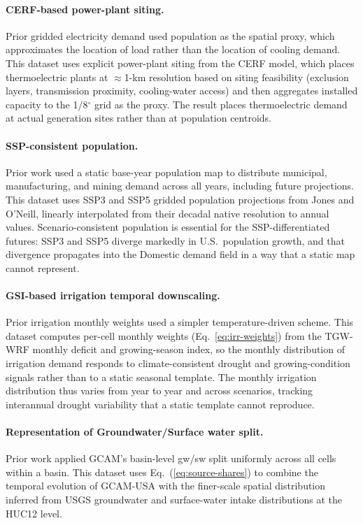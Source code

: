 \documentclass[fleqn,10pt]{wlscirep}
\begin{document}
\paragraph{CERF-based power-plant siting.} Prior gridded electricity demand used population as the spatial proxy, which approximates the location of load rather than the location of cooling demand. This dataset uses explicit power-plant siting from the CERF model\cite{Vernon2021,Mongird2025CERF}, which places thermoelectric plants at $\approx$1-km resolution based on siting feasibility (exclusion layers, transmission proximity, cooling-water access) and then aggregates installed capacity to the 1/8$^{\circ}$ grid as the proxy. The result places thermoelectric demand at actual generation sites rather than at population centroids.

\paragraph{SSP-consistent population.} Prior work used a static base-year population map to distribute municipal, manufacturing, and mining demand across all years, including future projections. This dataset uses SSP3 and SSP5 gridded population projections from Jones and O'Neill\cite{Jones_2016}, linearly interpolated from their decadal native resolution to annual values. Scenario-consistent population is essential for the SSP-differentiated futures: SSP3 and SSP5 diverge markedly in U.S.~population growth, and that divergence propagates into the Domestic demand field in a way that a static map cannot represent.

\paragraph{GSI-based irrigation temporal downscaling.} Prior irrigation monthly weights used a simpler temperature-driven scheme. This dataset computes per-cell monthly weights (Eq.~\ref{eq:irr-weights}) from the TGW-WRF monthly deficit and growing-season index, so the monthly distribution of irrigation demand responds to climate-consistent drought and growing-condition signals rather than to a static seasonal template. The monthly irrigation distribution thus varies from year to year and across scenarios, tracking interannual drought variability that a static template cannot reproduce.

\paragraph{Representation of Groundwater/Surface water split.} Prior work applied GCAM's basin-level gw/sw split uniformly across all cells within a basin. This dataset uses Eq.~(\ref{eq:source-shares}) to combine the temporal evolution of GCAM-USA with the finer-scale spatial distribution inferred from USGS groundwater and surface-water intake distributions at the HUC12 level. 
\end{document}

